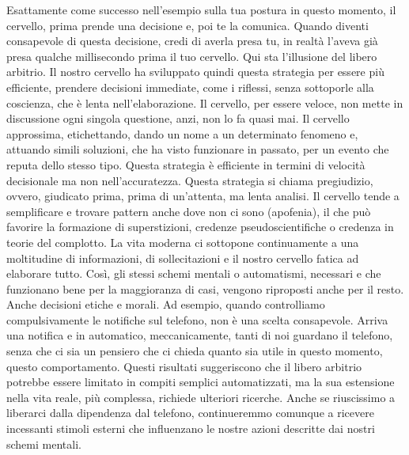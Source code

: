 \documentclass[12pt]{book} %
\begin{document}
Esattamente come successo nell'esempio sulla tua postura in questo momento, il cervello, prima
prende una decisione e, poi te la comunica. Quando diventi consapevole di questa decisione, credi di averla presa tu,
in realtà l'aveva già presa qualche millisecondo prima il tuo cervello. Qui sta
l'illusione del libero arbitrio. Il nostro cervello ha sviluppato quindi questa strategia per
essere più efficiente, prendere decisioni immediate, come i riflessi, senza sottoporle alla coscienza, che è lenta
nell'elaborazione. Il cervello, per essere veloce, non mette in discussione ogni singola
questione, anzi, non lo fa quasi mai. Il cervello approssima, etichettando, dando un nome a un determinato fenomeno e,
attuando simili soluzioni, che ha visto funzionare in passato, per un evento che reputa dello stesso tipo.
Questa strategia è efficiente in termini di velocità decisionale ma non nell'accuratezza. Questa
strategia si chiama pregiudizio, ovvero, giudicato prima, prima di un'attenta, ma lenta analisi.
Il cervello tende a semplificare e trovare pattern anche dove non ci sono (apofenia), il che può favorire la formazione di superstizioni, credenze pseudoscientifiche o credenza in teorie del complotto. La vita
moderna ci sottopone continuamente a una moltitudine di informazioni, di sollecitazioni e il nostro cervello fatica ad elaborare tutto. Così, gli stessi schemi mentali o automatismi, necessari e che funzionano bene per la maggioranza di casi, vengono riproposti anche per il resto. Anche decisioni etiche e morali. 
Ad esempio, quando controlliamo compulsivamente le notifiche sul telefono, non è una scelta consapevole. Arriva una notifica e in automatico, meccanicamente, tanti di noi guardano il telefono, senza che ci sia un pensiero che ci chieda quanto sia utile in questo momento, questo comportamento. Questi risultati suggeriscono che il libero arbitrio potrebbe essere limitato in compiti semplici automatizzati, ma la sua estensione nella vita reale, più complessa, richiede ulteriori ricerche. Anche se riuscissimo a liberarci dalla dipendenza dal telefono, continueremmo comunque a ricevere incessanti stimoli esterni che influenzano le nostre azioni descritte dai nostri schemi mentali.
\end{document}
